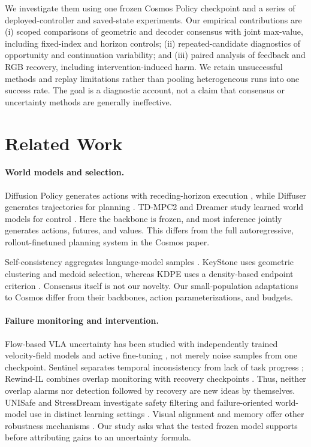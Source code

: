 \documentclass{article}
\begin{document}
We investigate them using one frozen Cosmos Policy checkpoint and a series
of deployed-controller and saved-state experiments. Our empirical
contributions are (i) scoped comparisons of geometric and decoder consensus
with joint max-value, including fixed-index and horizon controls;
(ii) repeated-candidate diagnostics of opportunity and continuation
variability; and (iii) paired analysis of feedback and RGB recovery,
including intervention-induced harm. We retain unsuccessful methods and
replay limitations rather than pooling heterogeneous runs into one success rate.
The goal is a diagnostic account, not a claim that consensus or uncertainty
methods are generally ineffective.

\section{Related Work}
\paragraph{World models and selection.}
Diffusion Policy generates actions with receding-horizon execution
\citep{diffusion_policy}, while Diffuser generates trajectories for planning
\citep{diffuser}. TD-MPC2 and Dreamer study learned world models for control
\citep{tdmpc2,dreamerv3}. Here the backbone is frozen, and most inference
jointly generates actions, futures, and values. This differs from the full
autoregressive, rollout-finetuned planning system in the Cosmos paper.

Self-consistency aggregates language-model samples \citep{self_consistency}.
KeyStone uses geometric clustering and medoid selection, whereas KDPE
uses a density-based endpoint criterion \citep{keystone,kdpe}.
Consensus itself is not our novelty. Our small-population adaptations to
Cosmos differ from their backbones, action parameterizations, and budgets.

\paragraph{Failure monitoring and intervention.}
Flow-based VLA uncertainty has been studied with independently trained
velocity-field models and active fine-tuning \citep{flow_uq}, not merely
noise samples from one checkpoint. Sentinel separates temporal inconsistency
from lack of task progress \citep{sentinel}; Rewind-IL combines overlap
monitoring with recovery checkpoints \citep{rewind_il}. Thus, neither overlap
alarms nor detection followed by recovery are new ideas by themselves.
UNISafe and StressDream investigate safety filtering and failure-oriented
world-model use in distinct learning settings \citep{unisafe,stressdream}.
Visual alignment and memory offer other robustness mechanisms
\citep{kachaev_blind_vla,kachaev_mu_vla}. Our study asks what the tested frozen
model supports before attributing gains to an uncertainty formula.
\end{document}
